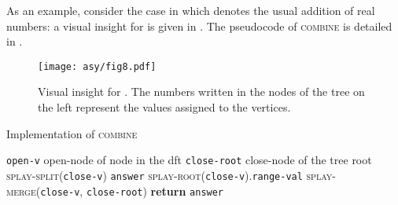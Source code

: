 \documentclass[a4paper,USenglish]{lipics}
\newcommand{\var}[1]{\textrm{\texttt{#1}}}
\begin{document}
As an example, consider the case in which  denotes the usual addition of real numbers: a visual insight for  is given in . The pseudocode of \textsc{combine} is detailed in .

\begin{figure}[t!]
				\texttt{[image: asy/fig8.pdf]}
				\caption{Visual insight for \label{fig:combine example}. The numbers written in the nodes of the tree on the left represent the values assigned to the vertices.}
			\end{figure}

		

			\begin{algorithm}[H]
			  \small
			  \caption{\small Implementation of \textsc{combine}}
			  \label{algo:combine}
			  \begin{algorithmic}[1]
				    \State \var{open-v}  open-node of node  in the dft
					\State \var{close-root}  close-node of the tree root
					\State \textsc{splay-split}(\var{close-v})
					\State \var{answer}  \textsc{splay-root}(\var{close-v}).\var{range-val}
					\State \textsc{splay-merge}(\var{close-v}, \var{close-root})
					\State \textbf{return} \var{answer}
			    \EndProcedure
			  \end{algorithmic}
			\end{algorithm}
			
\end{document}
